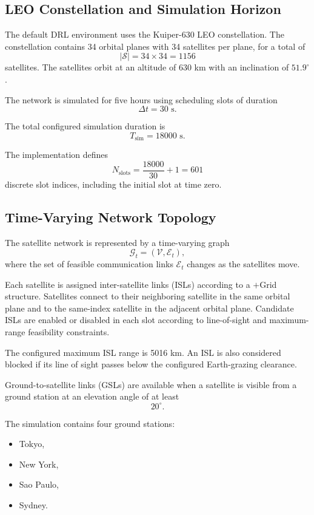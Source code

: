 \documentclass[11pt]{article}
\begin{document}
\subsection{LEO Constellation and Simulation Horizon}

The default DRL environment uses the Kuiper-630 LEO constellation. The
constellation contains 34 orbital planes with 34 satellites per plane, for a
total of
\[
|\mathcal{S}| = 34 \times 34 = 1156
\]
satellites. The satellites orbit at an altitude of 630 km with an inclination
of $51.9^\circ$.

The network is simulated for five hours using scheduling slots of duration
\[
\Delta t = 30\text{ s}.
\]

The total configured simulation duration is
\[
T_{\mathrm{sim}} = 18000\text{ s}.
\]

The implementation defines
\[
N_{\mathrm{slots}}
=
\frac{18000}{30}+1
=
601
\]
discrete slot indices, including the initial slot at time zero.


\subsection{Time-Varying Network Topology}

The satellite network is represented by a time-varying graph
\[
\mathcal{G}_t=(\mathcal{V},\mathcal{E}_t),
\]
where the set of feasible communication links $\mathcal{E}_t$ changes as the
satellites move.

Each satellite is assigned inter-satellite links (ISLs) according to a
$+$Grid structure. Satellites connect to their neighboring satellite in the
same orbital plane and to the same-index satellite in the adjacent orbital
plane. Candidate ISLs are enabled or disabled in each slot according to
line-of-sight and maximum-range feasibility constraints.

The configured maximum ISL range is 5016 km. An ISL is also considered
blocked if its line of sight passes below the configured Earth-grazing
clearance.

Ground-to-satellite links (GSLs) are available when a satellite is visible
from a ground station at an elevation angle of at least
\[
20^\circ.
\]

The simulation contains four ground stations:
\begin{itemize}
    \item Tokyo,
    \item New York,
    \item Sao Paulo,
    \item Sydney.
\end{itemize}
\end{document}

